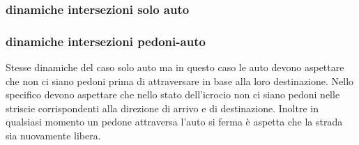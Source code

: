 \subsubsection{dinamiche intersezioni solo auto}

\subsubsection{dinamiche intersezioni pedoni-auto}
Stesse dinamiche del caso solo auto ma in questo caso le auto devono aspettare che non ci siano pedoni prima di attraversare in base alla loro destinazione.
Nello specifico devono aspettare che nello stato dell'icrocio non ci siano pedoni nelle striscie corrispondenti alla direzione di arrivo e di destinazione.
Inoltre in qualsiasi momento un pedone attraversa l'auto si ferma è aspetta che la strada sia nuovamente libera.


